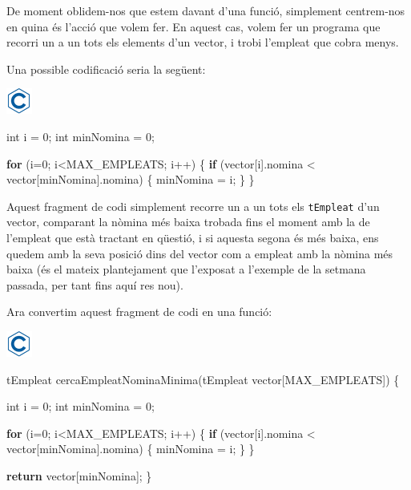 \documentclass[]{book}
\newenvironment{Shaded}{\begin{snugshade}}{\end{snugshade}}
\newcommand{\DataTypeTok}[1]{\textcolor[rgb]{0.13,0.29,0.53}{#1}}
\newcommand{\DecValTok}[1]{\textcolor[rgb]{0.00,0.00,0.81}{#1}}
\newcommand{\ControlFlowTok}[1]{\textcolor[rgb]{0.13,0.29,0.53}{\textbf{#1}}}
\newcommand{\NormalTok}[1]{#1}
\begin{document}
De moment oblidem-nos que estem davant d'una funció, simplement
centrem-nos en quina és l'acció que volem fer. En aquest cas, volem fer
un programa que recorri un a un tots els elements d'un vector, i trobi
l'empleat que cobra menys.

Una possible codificació seria la següent:

\includegraphics{./img/c.png}

\begin{Shaded}
\begin{Highlighting}[]
\DataTypeTok{int}\NormalTok{ i = }\DecValTok{0}\NormalTok{; }
\DataTypeTok{int}\NormalTok{ minNomina = }\DecValTok{0}\NormalTok{;}

\ControlFlowTok{for}\NormalTok{ (i=}\DecValTok{0}\NormalTok{; i<MAX_EMPLEATS; i++) \{}
    \ControlFlowTok{if}\NormalTok{ (vector[i].nomina < vector[minNomina].nomina) \{}
\NormalTok{        minNomina = i;}
\NormalTok{    \}}
\NormalTok{\}}
\end{Highlighting}
\end{Shaded}

Aquest fragment de codi simplement recorre un a un tots els
\texttt{tEmpleat} d'un vector, comparant la nòmina més baixa trobada
fins el moment amb la de l'empleat que està tractant en qüestió, i si
aquesta segona és més baixa, ens quedem amb la seva posició dins del
vector com a empleat amb la nòmina més baixa (és el mateix plantejament
que l'exposat a l'exemple de la setmana passada, per tant fins aquí res
nou).

Ara convertim aquest fragment de codi en una funció:

\includegraphics{./img/c.png}

\begin{Shaded}
\begin{Highlighting}[]
\NormalTok{tEmpleat cercaEmpleatNominaMinima(tEmpleat vector[MAX_EMPLEATS]) \{}

    \DataTypeTok{int}\NormalTok{ i = }\DecValTok{0}\NormalTok{; }
    \DataTypeTok{int}\NormalTok{ minNomina = }\DecValTok{0}\NormalTok{;}

    \ControlFlowTok{for}\NormalTok{ (i=}\DecValTok{0}\NormalTok{; i<MAX_EMPLEATS; i++) \{}
        \ControlFlowTok{if}\NormalTok{ (vector[i].nomina < vector[minNomina].nomina) \{}
\NormalTok{            minNomina = i;}
\NormalTok{        \}}
\NormalTok{    \}}

    \ControlFlowTok{return}\NormalTok{ vector[minNomina];}
\NormalTok{\}}
\end{Highlighting}
\end{Shaded}
\end{document}
